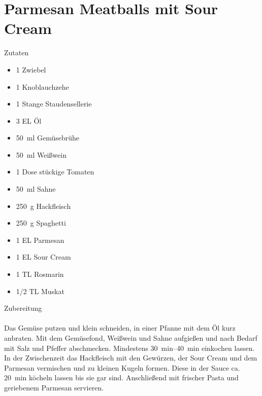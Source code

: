 \section*{Parmesan Meatballs mit Sour Cream}
\ihead{}\ohead{}
\cfoot{}
{\Large Zutaten}
\begin{multicols}{2}
\begin{itemize}
    \item \num{1} Zwiebel
    \item \num{1} Knoblauchzehe
    \item \num{1} Stange Staudensellerie
    \item \num{3} EL Öl
    \item \SI{50}{ml} Gemüsebrühe
    \item \SI{50}{ml} Weißwein
    \item \num{1} Dose stückige Tomaten
    \item \SI{50}{ml} Sahne
    \item \SI{250}{g} Hackfleisch
    \item \SI{250}{g} Spaghetti
    \item \num{1} EL Parmesan
    \item \num{1} EL Sour Cream
    \item \num{1} TL Rosmarin
    \item \num{1/2} TL Muskat
\end{itemize}
\end{multicols}
\noindent
{\Large Zubereitung}\\
\\
Das Gemüse putzen und klein schneiden, in einer Pfanne mit dem Öl kurz anbraten.
Mit dem Gemüsefond, Weißwein und Sahne aufgießen und nach Bedarf mit Salz und Pfeffer abschmecken.
Mindestens \SIrange{30}{40}{min} einkochen lassen.
In der Zwischenzeit das Hackfleisch mit den Gewürzen, der Sour Cream und dem Parmesan vermischen und zu kleinen Kugeln formen.
Diese in der Sauce ca. \SI{20}{min} köcheln lassen bis sie gar sind.
Anschließend mit frischer Pasta und geriebenem Parmesan servieren. 